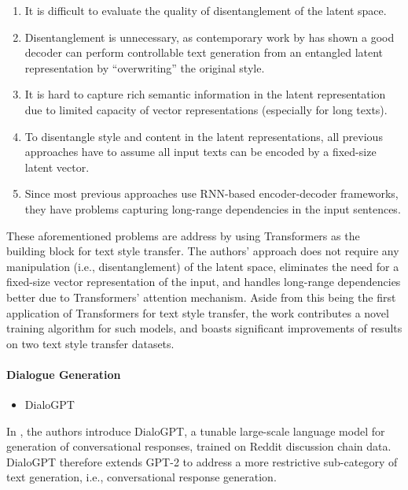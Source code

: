 \begin{enumerate}
    \item It is difficult to evaluate the quality of disentanglement of the latent space.
    \item Disentanglement is unnecessary, as contemporary work by \cite{lample2018multipleattribute} has shown a good decoder can perform controllable text generation from an entangled latent representation by ``overwriting'' the original style.
    \item It is hard to capture rich semantic information in the latent representation due to limited capacity of vector representations (especially for long texts).
    \item To disentangle style and content in the latent representations, all previous approaches have to assume all input texts can be encoded by a fixed-size latent vector.
    \item Since most previous approaches use RNN-based encoder-decoder frameworks, they have problems capturing long-range dependencies in the input sentences.
\end{enumerate}

These aforementioned problems are address by \citeauthor{dai-etal-2019-style} using Transformers \cite{vaswani2017attention} as the building block for text style transfer. The authors' approach does not require any manipulation (i.e., disentanglement) of the latent space, eliminates the need for a fixed-size vector representation of the input, and handles long-range dependencies better due to Transformers' attention mechanism. Aside from this being the first application of Transformers for text style transfer, the work contributes a novel training algorithm for such models, and boasts significant improvements of results on two text style transfer datasets.

\paragraph{Dialogue Generation}
\begin{itemize}
    \item DialoGPT
\end{itemize}

In \cite{zhang2019dialogpt}, the authors introduce DialoGPT, a tunable large-scale language model for generation of conversational responses, trained on Reddit discussion chain data. DialoGPT therefore extends GPT-2 \cite{radford2019language} to address a more restrictive sub-category of text generation, i.e., conversational response generation.  

